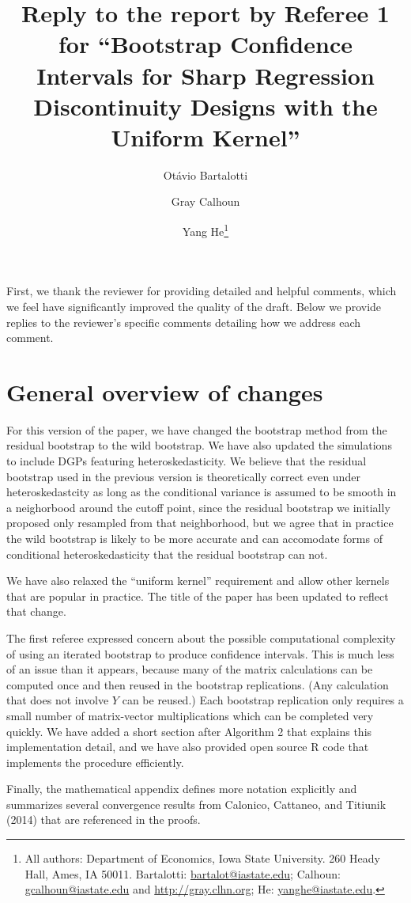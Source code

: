 \documentclass[12pt,fleqn]{article}
\title{Reply to the report by Referee 1 for ``Bootstrap Confidence Intervals for Sharp Regression Discontinuity Designs
  with the Uniform Kernel''}
\author{Ot\'avio Bartalotti \and Gray Calhoun \and Yang He\thanks{%
  All authors: Department of Economics, Iowa State University.
  260 Heady Hall, Ames, IA 50011.
  Bartalotti: \protect\url{bartalot@iastate.edu};
  Calhoun: \protect\url{gcalhoun@iastate.edu} and
  \protect\url{http://gray.clhn.org};
  He: \protect\url{yanghe@iastate.edu}.}}
\begin{document}
\maketitle

First, we thank the reviewer for providing detailed and helpful comments, which
we feel have significantly improved the quality of the draft.  Below we provide
replies to the reviewer's specific comments detailing how we address each
comment.

\section{General overview of changes}

For this version of the paper, we have changed the bootstrap method from the
residual bootstrap to the wild bootstrap. We have also updated the simulations
to include DGPs featuring heteroskedasticity. We believe that the residual
bootstrap used in the previous version is theoretically correct even under
heteroskedastcity as long as the conditional variance is assumed to be smooth in
a neighorbood around the cutoff point, since the residual bootstrap we initially
proposed only resampled from that neighborhood, but we agree that in practice
the wild bootstrap is likely to be more accurate and can accomodate forms of
conditional heteroskedasticity that the residual bootstrap can not.

We have also relaxed the ``uniform kernel'' requirement and allow other kernels
that are popular in practice. The title of the paper has been updated to reflect
that change.

The first referee expressed concern about the possible computational complexity of
using an iterated bootstrap to produce confidence intervals. This is much less
of an issue than it appears, because many of the matrix calculations can be
computed once and then reused in the bootstrap replications. (Any calculation
that does not involve $Y$ can be reused.) Each bootstrap replication only
requires a small number of matrix-vector multiplications which can be completed
very quickly. We have added a short section after Algorithm 2 that explains
this implementation detail, and we have also provided open source R code that
implements the procedure efficiently.

Finally, the mathematical appendix defines more notation explicitly and
summarizes several convergence results from Calonico, Cattaneo, and Titiunik
(2014) that are referenced in the proofs.
\end{document}
